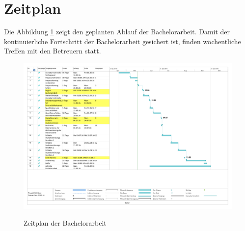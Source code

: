 \section{Zeitplan}
Die Abbildung \ref{abb:zeitplan} zeigt den geplanten Ablauf der Bachelorarbeit. Damit der kontinuierliche Fortschritt der Bachelorarbeit gesichert ist, finden wöchentliche Treffen mit den Betreuern statt.
\newpage
\begin{figure}
\includegraphics[scale=0.55, angle=90]{images/zeitplan.png}
\label{abb:zeitplan}
\caption{Zeitplan der Bachelorarbeit}
\end{figure}